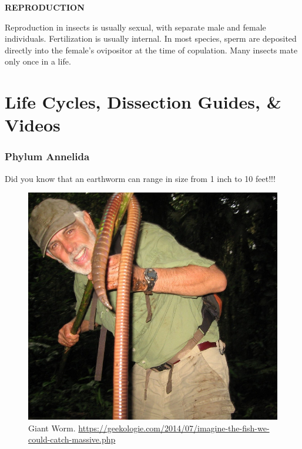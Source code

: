 \documentclass[
]{book}
\begin{document}
\textbf{REPRODUCTION}

Reproduction in insects is usually sexual, with separate male and female individuals. Fertilization
is usually internal. In most species, sperm are deposited directly into the female's ovipositor at
the time of copulation. Many insects mate only once in a life.

\hypertarget{life-cycles-dissection-guides-videos}{%
\chapter*{Life Cycles, Dissection Guides, \& Videos}\label{life-cycles-dissection-guides-videos}}

\hypertarget{phylum-annelida-1}{%
\subsection*{Phylum Annelida}\label{phylum-annelida-1}}

Did you know that an earthworm can range in size from 1 inch to 10 feet!!!

\begin{figure}
\centering
\includegraphics{images/Lab4_giant_worm.png}
\caption{Giant Worm. \url{https://geekologie.com/2014/07/imagine-the-fish-we-could-catch-massive.php}}
\end{figure}
\end{document}
